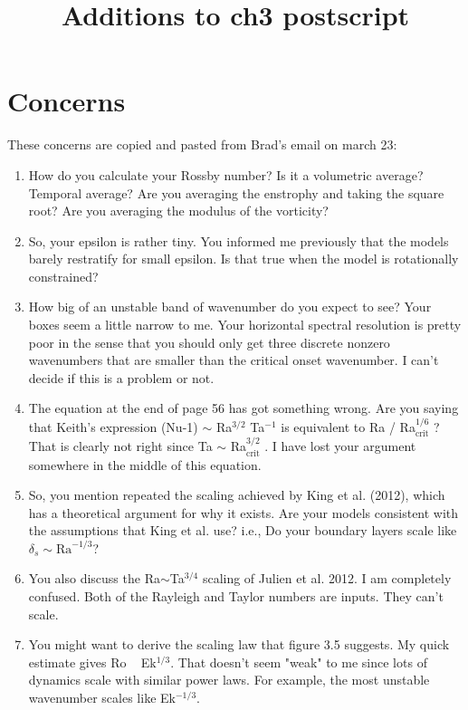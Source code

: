 \documentclass[aps, pre, onecolumn, nofootinbib, notitlepage, groupedaddress, amsfonts, amssymb, amsmath, longbibliography, superscriptaddress]{revtex4-1}
\begin{document}

\title{Additions to ch3 postscript}

\maketitle


\section{Concerns}
These concerns are copied and pasted from Brad's email on march 23:
\begin{enumerate}
\item How do you calculate your Rossby number?  Is it a volumetric average?  Temporal average? Are you averaging the enstrophy and taking the square root? Are you averaging the modulus of the vorticity?
\item So, your epsilon is rather tiny. You informed me previously that the models barely restratify for small epsilon.  Is that true when the model is rotationally constrained?
\item How big of an unstable band of wavenumber do you expect to see?  Your boxes seem a little narrow to me.  Your horizontal spectral resolution is pretty poor in the sense that you should only get three discrete nonzero wavenumbers that are smaller than the critical onset wavenumber.  I can't decide if this is a problem or not.
\item The equation at the end of page 56 has got something wrong. Are you saying that Keith's expression (Nu-1) $\sim$ Ra$^{3/2}$ Ta$^{-1}$ is equivalent to Ra / Ra$_\text{crit}^{1/6}$ ?  That is clearly not right since Ta $\sim$ Ra$_{\text{crit}}^{3/2}$ . I have lost your argument somewhere in the middle of this equation.
\item So, you mention repeated the scaling achieved by King et al. (2012), which has a theoretical argument for why it exists.  Are your models consistent with the assumptions that King et al. use? i.e., Do your boundary layers scale like $\delta_s \sim \text{Ra}^{-1/3}$?
\item You also discuss the Ra$\sim$Ta$^{3/4}$ scaling of Julien et al. 2012. I am completely confused.  Both of the Rayleigh and Taylor numbers are inputs.  They can't scale.
\item You might want to derive the scaling law that figure 3.5 suggests. My quick estimate gives Ro ~ Ek$^{1/3}$.  That doesn't seem "weak" to me since lots of dynamics scale with similar power laws.  For example, the most unstable wavenumber scales like Ek$^{-1/3}$.
\end{enumerate}
\end{document}
